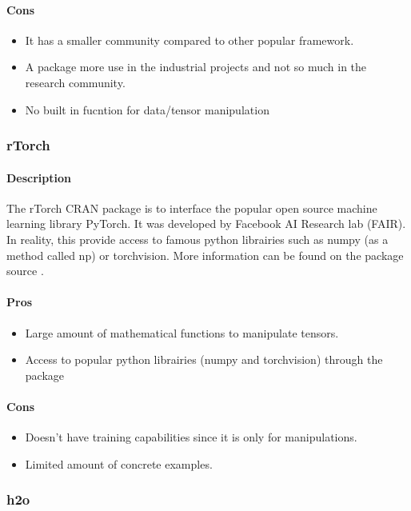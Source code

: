 \documentclass[letter,8pt]{article}\usepackage[]{graphicx}\usepackage[]{color}
\begin{document}
\paragraph{Cons}
\begin{itemize}
\item It has a smaller community compared to other popular framework.
\item A package more use in the industrial projects and not so much in the research community.
\item No built in fucntion for data/tensor manipulation
\end{itemize}


\subsubsection{rTorch}
\paragraph{Description}
The rTorch CRAN package is to interface the popular open source machine learning library PyTorch. It was developed by Facebook AI Research lab (FAIR). In reality, this provide access to famous python librairies such as numpy (as a method called np) or torchvision. More information can be found on the package source \cite{rTorch2019}.
\paragraph{Pros}
\begin{itemize}
\item Large amount of mathematical functions to manipulate tensors.
\item Access to popular python librairies (numpy and torchvision) through the package
\end{itemize}
\paragraph{Cons}
\begin{itemize}
\item Doesn't have training capabilities since it is only for manipulations.
\item Limited amount of concrete examples.
\end{itemize}
\subsubsection{h2o}
\end{document}
